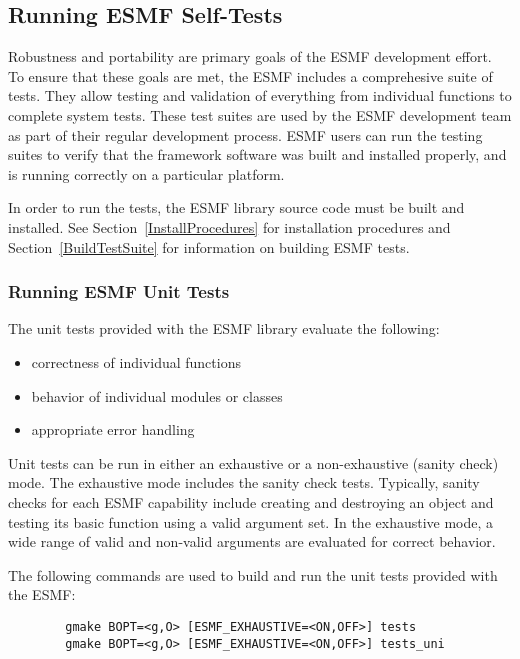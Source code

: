 
\subsection{Running ESMF Self-Tests}
\label{testing}

Robustness and portability are primary goals of the ESMF development effort. 
To ensure that these goals are met, the ESMF includes a comprehesive suite of tests. 
They allow testing and validation of everything from individual functions to complete 
system tests.  These test suites are used by the ESMF development team as part of their 
regular development process.  ESMF users can run the testing suites to verify that 
the framework software was built and installed properly, and is running correctly on
a particular platform. 

In order to run the tests, the ESMF library source code must be built and installed.  
See Section~\ref{InstallProcedures} for installation procedures and 
Section~\ref{BuildTestSuite} for information on building ESMF tests.  

\subsubsection{Running ESMF Unit Tests}

\label{UnitTestDescription}
The unit tests provided with the ESMF library evaluate the following:
\begin{itemize}
\item correctness of individual functions
\item behavior of individual modules or classes
\item appropriate error handling
\end{itemize}

Unit tests can be run in either an exhaustive or a non-exhaustive (sanity check)
mode.  The exhaustive mode includes the sanity check tests.  Typically, sanity
checks for each ESMF capability include creating and destroying an object and 
testing its basic function using a valid argument set.  In the exhaustive mode,
a wide range of valid and non-valid arguments are evaluated for correct behavior.

\label{RunUnitTests}

The following commands are used to build and run the unit tests provided with 
the ESMF:
\begin{verbatim}
        gmake BOPT=<g,O> [ESMF_EXHAUSTIVE=<ON,OFF>] tests
        gmake BOPT=<g,O> [ESMF_EXHAUSTIVE=<ON,OFF>] tests_uni
\end{verbatim}

